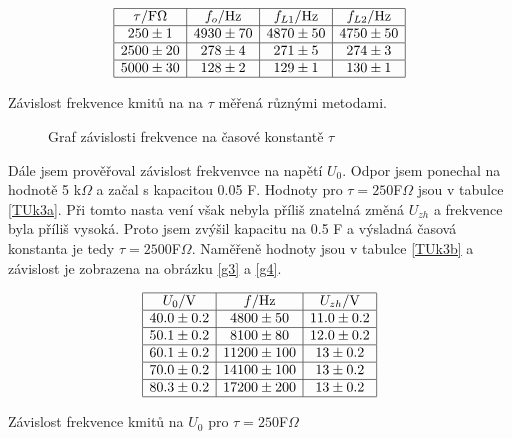 \documentclass[a4paper,12pt]{article}
\begin{document}
    \begin{table}
    $$
    \begin{array}{|c|c|c|c|}
    \hline
    \tau/\mbox{F}\Omega&    f_o/\mbox{Hz}&  f_{L1}/\mbox{Hz}& f_{L2}/\mbox{Hz} \\ \hline
    250\pm1&    4930\pm70&  4870\pm50&  4750\pm50 \\ \hline
    2500\pm20&  278\pm4&    271\pm5&    274\pm3 \\ \hline
    5000\pm30&  128\pm2&    129\pm1&    130\pm1 \\ \hline
    \end{array}
    $$
    \caption{Závislost frekvence kmitů na na $\tau$ měřená různými metodami.}
    \label{TUk2b}
    \end{table}
    
    \begin{figure}
    
    \caption{Graf závislosti frekvence na časové konstantě $\tau$}
    \label{g2}
    \end{figure}
    
    Dále jsem prověřoval závislost frekvenvce na napětí $U_0$. Odpor jsem ponechal na hodnotě 5 k$\Omega$ a začal s kapacitou 0.05 F. Hodnoty pro $\tau = 250$F$\Omega$
    jsou v tabulce \ref{TUk3a}. Při tomto nasta vení však nebyla příliš znatelná změná $U_{zh}$ a frekvence byla příliš vysoká. Proto jsem zvýšil kapacitu na 0.5 F 
    a výsladná časová konstanta je tedy $\tau = 2500$F$\Omega$. Naměřeně hodnoty jsou v tabulce \ref{TUk3b} a závislost je zobrazena na obrázku \ref{g3} a \ref{g4}.

    \begin{table}
    $$
    \begin{array}{|c|c|c|}
    \hline
    U_0/\mbox{V}&   f/\mbox{Hz}&    U_{zh}/\mbox{V} \\ \hline
    40.0\pm0.2& 4800\pm50&  11.0\pm0.2 \\ \hline
    50.1\pm0.2& 8100\pm80&  12.0\pm0.2 \\ \hline
    60.1\pm0.2& 11200\pm100&    13\pm0.2 \\ \hline
    70.0\pm0.2& 14100\pm100&    13\pm0.2 \\ \hline
    80.3\pm0.2& 17200\pm200&    13\pm0.2 \\ \hline
    \end{array}
    $$
    \caption{Závislost frekvence kmitů na $U_0$ pro $\tau=250$F$\Omega$}
    \label{TUk3a}
    \end{table}
\end{document}
